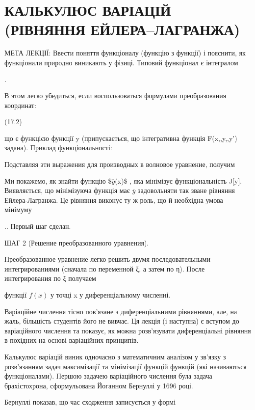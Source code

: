 \documentclass[
  ukrainian,
]{article}
\begin{document}
\section{КАЛЬКУЛЮС ВАРІАЦІЙ (РІВНЯННЯ
ЕЙЛЕРА--ЛАГРАНЖА)}\label{ux43aux430ux43bux44cux43aux443ux43bux44eux441-ux432ux430ux440ux456ux430ux446ux456ux439-ux440ux456ux432ux43dux44fux43dux43dux44f-ux435ux439ux43bux435ux440ux430ux43bux430ux433ux440ux430ux43dux436ux430}

МЕТА ЛЕКЦІЇ: Ввести поняття функціоналу (функцію з функції) і пояснити,
як функціонали природно виникають у фізиці. Типовий функціонал є
інтегралом

.

В этом легко убедиться, если воспользоваться формулами преобразования
координат:

(17.2)

що є функцією функції y (припускається, що інтегративна функція
F\left(x,,y,,y'\right) задана). Приклад функціональності:

Подставляя эти выражения для производных в волновое уравнение, получим

Ми покажемо, як знайти функцію \$\(\overline{y}\)(x)\$ , яка мінімізує
функціональність J{[}y{]}. Виявляється, що мінімізуюча функція має
\(\overline{y}\) задовольняти так зване рівняння Ейлера-Лагранжа. Це
рівняння виконує ту ж роль, що й необхідна умова мінімуму

.. Первый шаг сделан.

ШАГ 2 (Решение преобразованного уравнения).

Преобразованное уравнение легко решить двумя последовательными
интегрированиями (сначала по переменной ξ, а затем по η). После
интегрирования по ξ получаем

функції \(f(x)\) у точці x у диференціальному численні.

Варіаційне числення тісно пов'язане з диференціальними рівняннями, але,
на жаль, більшість студентів його не вивчає. Ця лекція (і наступна) є
вступом до варіаційного числення та показує, як можна розв'язувати
диференціальні рівняння в похідних на основі варіаційних принципів.

Калькулюс варіацій виник одночасно з математичним аналізом у зв'язку з
розв'язанням задач максимізації та мінімізації функцій функцій (які
називаються функціоналами). Першою задачею варіаційного числення була
задача брахістохрона, сформульована Йоганном Бернуллі у 1696 році.

Бернуллі показав, що час сходження записується у формі
\end{document}
